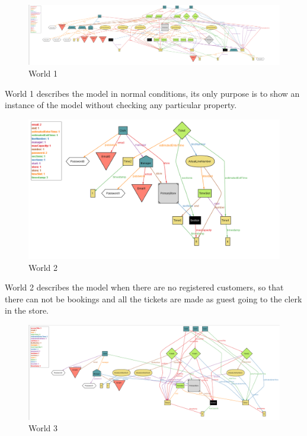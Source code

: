 \begin{figure}[H]
    \centering
    \includegraphics[height=0.5\textwidth]{Images/world1.png}
    \caption{World 1}
\end{figure}

World 1 describes the model in normal conditions, its only purpose is to show an instance of the model without checking
any particular property.

\begin{figure}[H]
    \centering
    \includegraphics[height=0.5\textwidth]{Images/world2.png}
    \caption{World 2}
\end{figure}

World 2 describes the model when there are no registered customers, so that there can not be bookings and all the
tickets are made as guest going to the clerk in the store.

\begin{figure}[H]
    \centering
    \includegraphics[height=0.5\textwidth]{Images/world3.png}
    \caption{World 3}
\end{figure}

